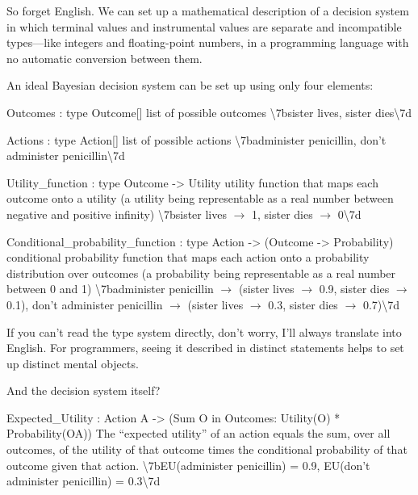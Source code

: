 {
 So forget English. We can set up a mathematical description of a
decision system in which terminal values and instrumental values are
separate and incompatible types---like integers and floating-point
numbers, in a programming language with no automatic conversion between
them.}

{
 An ideal Bayesian decision system can be set up using only four
elements:}

{
  Outcomes : type Outcome[] list of possible outcomes
{\textbackslash}{\textquotesingle}7bsister lives, sister
dies{\textbackslash}{\textquotesingle}7d }

{
  Actions : type Action[] list of possible actions
{\textbackslash}{\textquotesingle}7badminister penicillin,
don't administer
penicillin{\textbackslash}{\textquotesingle}7d }

{
  Utility\_function : type Outcome -{\textgreater} Utility utility
function that maps each outcome onto a utility (a utility being
representable as a real number between negative and positive infinity)
{\textbackslash}{\textquotesingle}7bsister lives $\rightarrow $ 1,
sister dies $\rightarrow $ 0{\textbackslash}{\textquotesingle}7d }

{
  Conditional\_probability\_function :\newline
 type Action -{\textgreater} (Outcome -{\textgreater} Probability)
conditional probability function that maps each action onto a
probability distribution over outcomes (a probability being
representable as a real number between 0 and 1)
{\textbackslash}{\textquotesingle}7badminister penicillin $\rightarrow
$ (sister lives $\rightarrow $ 0.9, sister dies $\rightarrow $ 0.1),
don't administer penicillin $\rightarrow $ (sister
lives $\rightarrow $ 0.3, sister dies $\rightarrow $
0.7){\textbackslash}{\textquotesingle}7d }

{
 If you can't read the type system directly,
don't worry, I'll always translate into
English. For programmers, seeing it described in distinct statements
helps to set up distinct mental objects.}

{
 And the decision system itself?}

{
  Expected\_Utility : Action A -{\textgreater}\newline
 (Sum O in Outcomes: Utility(O) * Probability(O{\textbar}A)) The
``expected utility'' of an action
equals the sum, over all outcomes, of the utility of that outcome times
the conditional probability of that outcome given that action.
{\textbackslash}{\textquotesingle}7bEU(administer penicillin) = 0.9,
EU(don't administer penicillin) =
0.3{\textbackslash}{\textquotesingle}7d }

